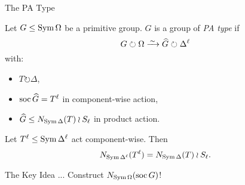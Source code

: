 
\begin{frame}{The PA Type}
    \begin{defn}
        Let $G \leq \operatorname{Sym} \Omega$ be a primitive group.
        $G$ is a group of \emph{PA type} if
        \\[-0.5em]
        \pause
        \[
        G \circlearrowright \Omega
        \iso
        \myhat G \circlearrowright \Delta ^
        \ell
        \]
        with:
        \vspace{-0.5em}
        \pause
        \begin{itemize}
            \item
            $T \circlearrowright \Delta$,
            \pause
            \item
            $\operatorname{soc} \widehat{G} = T ^ \ell$ in component-wise action,
            \pause
            \item
            $\widehat{G} \leq N_{\operatorname{Sym} \Delta}(T) \wr S_\ell$ in product action.
        \end{itemize}
    \end{defn}
    \pause

    \begin{lemma}
        Let $T ^ \ell \leq \operatorname{Sym} \Delta ^ \ell$ act component-wise. Then
        \\[-0.5em]
        \pause
        \[
        N_{\operatorname{Sym} \Delta ^ \ell}( T ^ \ell ) = N_{\operatorname{Sym} \Delta}(T) \wr S_\ell.
        \]
    \end{lemma}
\end{frame}


\begin{frame}{The Key Idea ...}
    \centering
    {\Large
    Construct $N_{\operatorname{Sym} \Omega}(\operatorname{soc} G)$!
    }
\end{frame}

